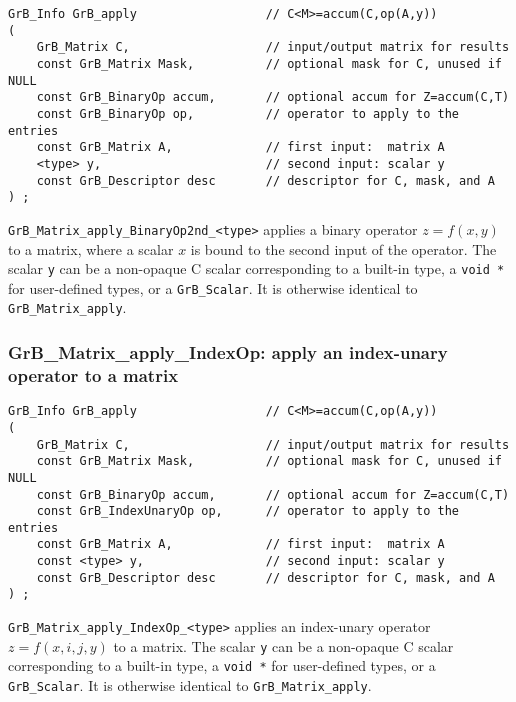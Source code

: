 \documentclass[12pt]{article}
\begin{document}
{\begin{mdframed}[userdefinedwidth=6in]
{\footnotesize
\begin{verbatim}
GrB_Info GrB_apply                  // C<M>=accum(C,op(A,y))
(
    GrB_Matrix C,                   // input/output matrix for results
    const GrB_Matrix Mask,          // optional mask for C, unused if NULL
    const GrB_BinaryOp accum,       // optional accum for Z=accum(C,T)
    const GrB_BinaryOp op,          // operator to apply to the entries
    const GrB_Matrix A,             // first input:  matrix A
    <type> y,                       // second input: scalar y
    const GrB_Descriptor desc       // descriptor for C, mask, and A
) ;
\end{verbatim} } \end{mdframed}

\verb'GrB_Matrix_apply_BinaryOp2nd_<type>'  applies a binary operator
$z=f(x,y)$ to a matrix, where a scalar $x$ is bound to the second input of the
operator.
The scalar \verb'y' can be a non-opaque C scalar corresponding to a built-in
type, a \verb'void *' for user-defined types, or a \verb'GrB_Scalar'.
It is otherwise identical to \verb'GrB_Matrix_apply'.

\subsubsection{{\sf GrB\_Matrix\_apply\_IndexOp:} apply an index-unary operator to a matrix}
\label{matrix_apply_idxunop}

\begin{mdframed}[userdefinedwidth=6in]
{\footnotesize
\begin{verbatim}
GrB_Info GrB_apply                  // C<M>=accum(C,op(A,y))
(
    GrB_Matrix C,                   // input/output matrix for results
    const GrB_Matrix Mask,          // optional mask for C, unused if NULL
    const GrB_BinaryOp accum,       // optional accum for Z=accum(C,T)
    const GrB_IndexUnaryOp op,      // operator to apply to the entries
    const GrB_Matrix A,             // first input:  matrix A
    const <type> y,                 // second input: scalar y
    const GrB_Descriptor desc       // descriptor for C, mask, and A
) ;
\end{verbatim} } \end{mdframed}

\verb'GrB_Matrix_apply_IndexOp_<type>'  applies an index-unary operator
$z=f(x,i,j,y)$ to a matrix.
The scalar \verb'y' can be a non-opaque C scalar corresponding to a built-in
type, a \verb'void *' for user-defined types, or a \verb'GrB_Scalar'.
It is otherwise identical to \verb'GrB_Matrix_apply'.

}
\end{document}
